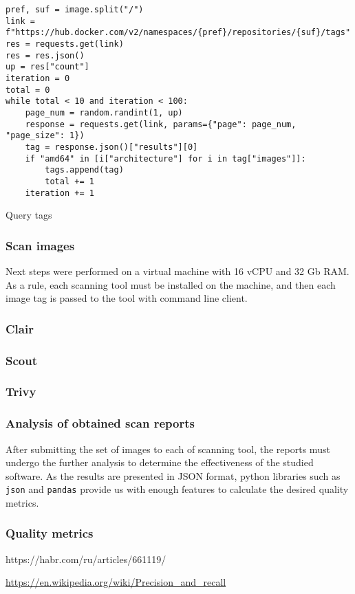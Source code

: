 \begin{listing}[htp]
    \centering
    \begin{minipage}{1\linewidth}
        \begin{verbatim}
pref, suf = image.split("/")
link = f"https://hub.docker.com/v2/namespaces/{pref}/repositories/{suf}/tags"
res = requests.get(link)
res = res.json()
up = res["count"]
iteration = 0
total = 0
while total < 10 and iteration < 100:
    page_num = random.randint(1, up)
    response = requests.get(link, params={"page": page_num, "page_size": 1})
    tag = response.json()["results"][0]
    if "amd64" in [i["architecture"] for i in tag["images"]]:
        tags.append(tag)
        total += 1
    iteration += 1
        \end{verbatim}
    \end{minipage}
    \caption{Query tags}
    \label{lst:tags}
\end{listing}

\subsubsection{Scan images}

Next steps were performed on a virtual machine with 16 vCPU and 32 Gb RAM. As a rule, each scanning tool must be installed on the machine, and then each image tag is passed to the tool with command line client.

\subsubsection*{Clair}




\subsubsection*{Scout}





\subsubsection*{Trivy} 




\subsubsection{Analysis of obtained scan reports}

After submitting the set of images to each of scanning tool, the reports must undergo the further analysis to determine the effectiveness of the studied software. As the results are presented in JSON format, python libraries such as \texttt{json} and \texttt{pandas} provide us with enough features to calculate the desired quality metrics. 

\subsubsection*{Quality metrics}

https://habr.com/ru/articles/661119/

\url{https://en.wikipedia.org/wiki/Precision_and_recall}